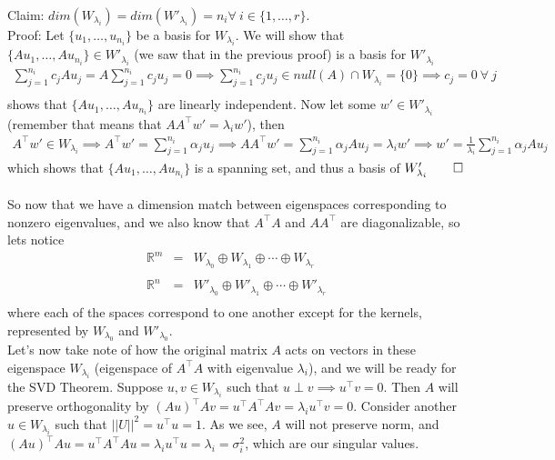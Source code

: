 \documentclass[11pt]{article}
\begin{document}
Claim: $dim(W_{\lambda_i}) = dim(W'_{\lambda_i}) = n_i \forall \ i \in \{1,\dots,r\}$.\\
Proof: Let $\{u_1,\dots,u_{n_i}\}$ be a basis for $W_{\lambda_i}$. We will show that $\{Au_1,\dots,Au_{n_i}\} \in W'_{\lambda_i}$ (we saw that in the previous proof) is a basis for $W'_{\lambda_i}$
\begin{eqnarray*}
\sum_{j=1}^{n_i} c_j Au_j = A\sum_{j=1}^{n_i} c_j u_j = 0 \implies \sum_{j=1}^{n_i} c_j u_j \in null(A) \cap W_{\lambda_i} = \{0\} \implies c_j = 0 \ \forall \ j\\
\end{eqnarray*}
shows that $\{Au_1,\dots,Au_{n_i}\}$ are linearly independent. Now let some $w' \in W'_{\lambda_i}$ (remember that means that $AA^\intercal w' = \lambda_i w'$), then
\begin{eqnarray*}
A^\intercal w' \in W_{\lambda_i} \implies A^\intercal w' = \sum_{j=1}^{n_i} \alpha_ju_j \implies AA^\intercal w' = \sum_{j=1}^{n_i} \alpha_j Au_j = \lambda_i w' \implies w' = \frac{1}{\lambda_i}\sum_{j=1}^{n_i}\alpha_j Au_j
\end{eqnarray*}
which shows that $\{Au_1,\dots,Au_{n_i}\}$ is a spanning set, and thus a basis of $W'_{\lambda_i} \qed$\\\\

So now that we have a dimension match between eigenspaces corresponding to nonzero eigenvalues, and we also know that $A^\intercal A$ and $AA^\intercal$ are diagonalizable, so lets notice
\begin{eqnarray*}
\mathbb{R}^m &=& W_{\lambda_0} \oplus W_{\lambda_1} \oplus \cdots \oplus W_{\lambda_r}\\
&&\\
\mathbb{R}^n &=& W'_{\lambda_0} \oplus W'_{\lambda_1} \oplus \cdots \oplus W'_{\lambda_r}\\
\end{eqnarray*}
where each of the spaces correspond to one another except for the kernels, represented by $W_{\lambda_0}$ and $W'_{\lambda_0}$.\\

Let's now take note of how the original matrix $A$ acts on vectors in these eigenspace $W_{\lambda_i}$ (eigenspace of $A^\intercal A$ with eigenvalue $\lambda_i$), and we will be ready for the SVD Theorem. Suppose $u,v \in W_{\lambda_i}$ such that $u \perp v \implies u^\intercal v = 0$. Then $A$ will preserve orthogonality by $(Au)^\intercal Av = u^\intercal A^\intercal A v = \lambda_i u^\intercal v = 0$. Consider another $u \in W_{\lambda_i}$ such that $\vert\vert U \vert\vert^2 = u^\intercal u = 1$. As we see, $A$ will not preserve norm, and $(Au)^\intercal Au = u^\intercal A^\intercal A u = \lambda_i u^\intercal u = \lambda_i = \sigma_i^2$, which are our singular values.
\end{document}

